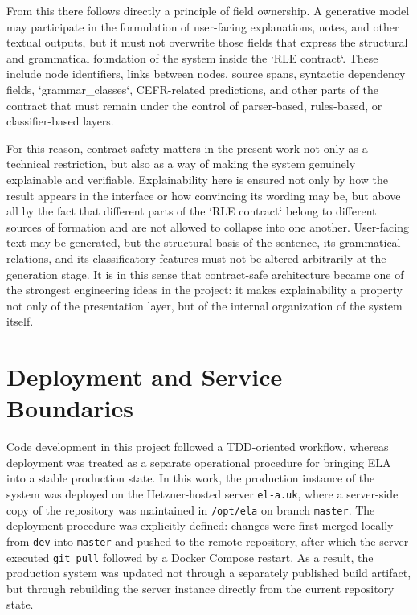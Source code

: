 \documentclass[12pt,a4paper,oneside]{report}
\begin{document}
From this there follows directly a principle of field ownership. A generative model may participate in the formulation of user-facing explanations, notes, and other textual outputs, but it must not overwrite those fields that express the structural and grammatical foundation of the system inside the `RLE contract`. These include node identifiers, links between nodes, source spans, syntactic dependency fields, `grammar\_classes`, CEFR-related predictions, and other parts of the contract that must remain under the control of parser-based, rules-based, or classifier-based layers.

For this reason, contract safety matters in the present work not only as a technical restriction, but also as a way of making the system genuinely explainable and verifiable. Explainability here is ensured not only by how the result appears in the interface or how convincing its wording may be, but above all by the fact that different parts of the `RLE contract` belong to different sources of formation and are not allowed to collapse into one another. User-facing text may be generated, but the structural basis of the sentence, its grammatical relations, and its classificatory features must not be altered arbitrarily at the generation stage. It is in this sense that contract-safe architecture became one of the strongest engineering ideas in the project: it makes explainability a property not only of the presentation layer, but of the internal organization of the system itself.

\section{Deployment and Service Boundaries}
Code development in this project followed a TDD-oriented workflow, whereas deployment was treated as a separate operational procedure for bringing ELA into a stable production state. In this work, the production instance of the system was deployed on the Hetzner-hosted server \texttt{el-a.uk}, where a server-side copy of the repository was maintained in \texttt{/opt/ela} on branch \texttt{master}. The deployment procedure was explicitly defined: changes were first merged locally from \texttt{dev} into \texttt{master} and pushed to the remote repository, after which the server executed \texttt{git pull} followed by a Docker Compose restart. As a result, the production system was updated not through a separately published build artifact, but through rebuilding the server instance directly from the current repository state.
\end{document}

